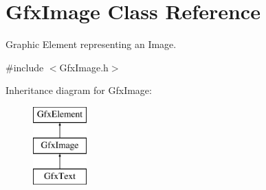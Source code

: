 \hypertarget{classGfxImage}{\section{Gfx\-Image Class Reference}
\label{classGfxImage}
}


Graphic Element representing an Image.  




{\ttfamily \#include $<$Gfx\-Image.\-h$>$}

Inheritance diagram for Gfx\-Image\-:\begin{figure}[H]
\begin{center}
\leavevmode
\includegraphics[height=3.000000cm]{classGfxImage}
\end{center}
\end{figure}
